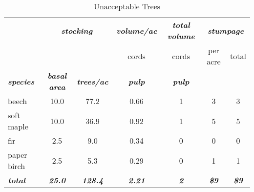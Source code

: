 \documentclass[landscape]{article}
\begin{document}
\begin{table}[H]

\caption{\label{tab:unnamed-chunk-29}Unacceptable Trees}
\fontsize{10}{12}\selectfont
\begin{tabular}[t]{lcccccc}
\toprule
\multicolumn{1}{c}{\em{\textbf{ }}} & \multicolumn{2}{c}{\em{\textbf{stocking}}} & \multicolumn{1}{c}{\em{\textbf{volume/ac }}} & \multicolumn{1}{c}{\em{\textbf{total volume}}} & \multicolumn{2}{c}{\em{\textbf{stumpage}}} \\
\cmidrule(l{3pt}r{3pt}){2-3} \cmidrule(l{3pt}r{3pt}){4-4} \cmidrule(l{3pt}r{3pt}){5-5} \cmidrule(l{3pt}r{3pt}){6-7}
\multicolumn{3}{c}{ } & \multicolumn{1}{c}{cords} & \multicolumn{1}{c}{cords} & \multicolumn{1}{c}{per acre} & \multicolumn{1}{c}{total} \\
\cmidrule(l{3pt}r{3pt}){4-4} \cmidrule(l{3pt}r{3pt}){5-5} \cmidrule(l{3pt}r{3pt}){6-6} \cmidrule(l{3pt}r{3pt}){7-7}
\rowcolor[HTML]{DCDCDC}  \em{\textbf{species}} & \em{\textbf{basal area}} & \em{\textbf{trees/ac}} & \em{\textbf{pulp}} & \em{\textbf{pulp}} & \em{\textbf{ }} & \em{\textbf{ }}\\
\midrule
\rowcolor{gray!6}  beech & 10.0 & 77.2 & 0.66 & 1 & 3 & 3\\
 
soft maple & 10.0 & 36.9 & 0.92 & 1 & 5 & 5\\
 
\rowcolor{gray!6}  fir & 2.5 & 9.0 & 0.34 & 0 & 0 & 0\\
 
paper birch & 2.5 & 5.3 & 0.29 & 0 & 1 & 1\\
 
\rowcolor{gray!6}  \rowcolor[HTML]{DCDCDC}  \em{\textbf{total}} & \em{\textbf{25.0}} & \em{\textbf{128.4}} & \em{\textbf{2.21}} & \em{\textbf{2}} & \em{\textbf{\$9}} & \em{\textbf{\$9}}\\
\bottomrule
\end{tabular}
\end{table}
\end{document}
